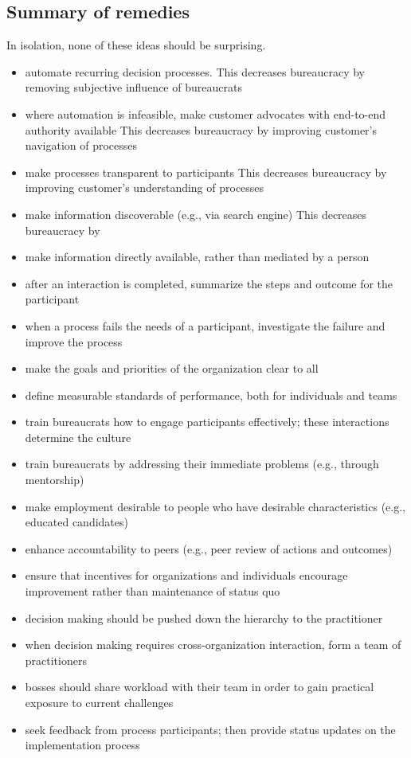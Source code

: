 \subsection{Summary of remedies}
In isolation, none of these ideas should be surprising.
\begin{itemize}
    \item automate recurring decision processes. This decreases bureaucracy by removing subjective influence of bureaucrats
\item where automation is infeasible, make customer advocates with end-to-end authority available
This decreases bureaucracy by improving customer's navigation of processes
\item make processes transparent to participants
This decreases bureaucracy by improving customer's understanding of processes
\item make information discoverable (e.g., via search engine) 
This decreases bureaucracy by 
\item make information directly available, rather than mediated by a person
\item after an interaction is completed, summarize the steps and outcome for the participant
\item when a process fails the needs of a participant, investigate the failure and improve the process
\item make the goals and priorities of the organization clear to all
\item define measurable standards of performance, both for individuals and teams
\item train bureaucrats how to engage participants effectively; these interactions determine the culture
\item train bureaucrats by addressing their immediate problems (e.g., through mentorship)
\item make employment desirable to people who have desirable characteristics (e.g., educated candidates)
\item enhance accountability to peers (e.g., peer review of actions and outcomes)
\item ensure that incentives for organizations and individuals encourage improvement rather than maintenance of status quo
\item decision making should be pushed down the hierarchy to the practitioner
\item when decision making requires cross-organization interaction, form a team of practitioners
\item bosses should share workload with their team in order to gain practical exposure to current challenges
\item seek feedback from process participants; then provide status updates on the implementation process
\end{itemize}
